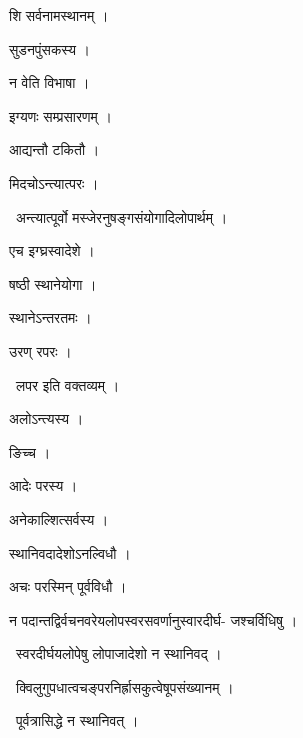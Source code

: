 \documentclass[10pt, openany, oneside]{book}
\begin{document}
\noindent शि सर्वनामस्थानम् ।

\noindent सुडनपुंसकस्य ।

\noindent न वेति विभाषा ।

\noindent इग्यणः सम्प्रसारणम् ।

\noindent आद्यन्तौ टकितौ ।

\noindent मिदचोऽन्त्यात्परः ।

\par\noindent\hspace{1.5em}{\vps वा॰}~{\qt अन्त्यात्पूर्वो मस्जेरनुषङ्गसंयोगादिलोपार्थम् ।}

\noindent एच इग्घ्रस्वादेशे ।

\noindent षष्ठी स्थानेयोगा ।

\noindent स्थानेऽन्तरतमः ।

\noindent उरण् रपरः ।

\par\noindent\hspace{1.5em}{\vps वा॰}~{\qt लपर इति वक्तव्यम् ।}

\noindent अलोऽन्त्यस्य ।

\noindent ङिच्च ।

\noindent आदेः परस्य ।

\noindent अनेकाल्शित्सर्वस्य ।

\noindent स्थानिवदादेशोऽनल्विधौ ।

\noindent अचः परस्मिन् पूर्वविधौ ।

\noindent न पदान्तद्विर्वचनवरेयलोपस्वरसवर्णानुस्वारदीर्घ- जश्चर्विधिषु ।

\par\noindent\hspace{1.5em}{\vps वा॰}~{\qt स्वरदीर्घयलोपेषु लोपाजादेशो न स्थानिवद् ।}

\par\noindent\hspace{1.5em}{\vps वा॰}~{\qt क्विलुगुपधात्वचङ्परनिर्ह्रासकुत्वेषूपसंख्यानम् ।}

\par\noindent\hspace{1.5em}{\vps वा॰}~{\qt पूर्वत्रासिद्धे न स्थानिवत् ।}
\end{document}
